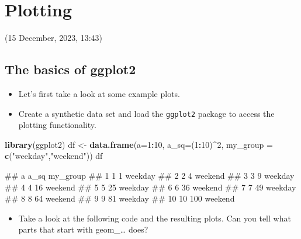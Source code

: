 \documentclass[
]{book}
\newenvironment{Shaded}{\begin{snugshade}}{\end{snugshade}}
\newcommand{\AttributeTok}[1]{\textcolor[rgb]{0.13,0.29,0.53}{#1}}
\newcommand{\DecValTok}[1]{\textcolor[rgb]{0.00,0.00,0.81}{#1}}
\newcommand{\FunctionTok}[1]{\textcolor[rgb]{0.13,0.29,0.53}{\textbf{#1}}}
\newcommand{\NormalTok}[1]{#1}
\newcommand{\OtherTok}[1]{\textcolor[rgb]{0.56,0.35,0.01}{#1}}
\newcommand{\SpecialCharTok}[1]{\textcolor[rgb]{0.81,0.36,0.00}{\textbf{#1}}}
\newcommand{\StringTok}[1]{\textcolor[rgb]{0.31,0.60,0.02}{#1}}
\providecommand{\tightlist}{%
  \setlength{\itemsep}{0pt}\setlength{\parskip}{0pt}}
\begin{document}
\hypertarget{plotting-1}{%
\chapter{Plotting}\label{plotting-1}}

(15 December, 2023, 13:43)

\hypertarget{the-basics-of-ggplot2}{%
\section{The basics of ggplot2}\label{the-basics-of-ggplot2}}

\begin{itemize}
\tightlist
\item
  Let's first take a look at some example plots.
\item
  Create a synthetic data set and load the \texttt{ggplot2} package to access the plotting functionality.
\end{itemize}

\begin{Shaded}
\begin{Highlighting}[]
\FunctionTok{library}\NormalTok{(ggplot2)}
\NormalTok{df }\OtherTok{\textless{}{-}} \FunctionTok{data.frame}\NormalTok{(}\AttributeTok{a=}\DecValTok{1}\SpecialCharTok{:}\DecValTok{10}\NormalTok{, }\AttributeTok{a\_sq=}\NormalTok{(}\DecValTok{1}\SpecialCharTok{:}\DecValTok{10}\NormalTok{)}\SpecialCharTok{\^{}}\DecValTok{2}\NormalTok{, }\AttributeTok{my\_group =} \FunctionTok{c}\NormalTok{(}\StringTok{"weekday"}\NormalTok{,}\StringTok{"weekend"}\NormalTok{))}
\NormalTok{df}
\end{Highlighting}
\end{Shaded}

\begin{Shaded}
\begin{Highlighting}[]
\NormalTok{\#\#     a a\_sq my\_group}
\NormalTok{\#\# 1   1    1  weekday}
\NormalTok{\#\# 2   2    4  weekend}
\NormalTok{\#\# 3   3    9  weekday}
\NormalTok{\#\# 4   4   16  weekend}
\NormalTok{\#\# 5   5   25  weekday}
\NormalTok{\#\# 6   6   36  weekend}
\NormalTok{\#\# 7   7   49  weekday}
\NormalTok{\#\# 8   8   64  weekend}
\NormalTok{\#\# 9   9   81  weekday}
\NormalTok{\#\# 10 10  100  weekend}
\end{Highlighting}
\end{Shaded}

\begin{itemize}
\tightlist
\item
  Take a look at the following code and the resulting plots. Can you tell what parts that start with geom\_\ldots{} does?
\end{itemize}
\end{document}
